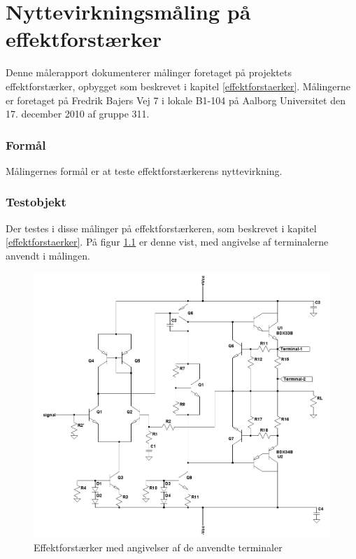 \chapter{Nyttevirkningsmåling på effektforstærker}
\label{maalejournal-nytte}

Denne målerapport dokumenterer målinger foretaget på projektets effektforstærker, opbygget som beskrevet i kapitel \ref{effektforstaerker}. Målingerne er foretaget på Fredrik Bajers Vej 7 i lokale B1-104 på Aalborg Universitet den 17. december 2010 af gruppe 311.

\subsection*{Formål}

Målingernes formål er at teste effektforstærkerens nyttevirkning.


\subsection*{Testobjekt}
Der testes i disse målinger på effektforstærkeren, som beskrevet i kapitel \ref{effektforstaerker}. På figur \ref{fig:testob_efforstaerker_nytte} er denne vist, med angivelse af terminalerne anvendt i målingen.

\begin{figure}[h]
\centering
\includegraphics[width=\textwidth]{maalerapporter/effektforstaerker/effektforstaerker_nyttevirkning_test.png}
\caption{Effektforstærker med angivelser af de anvendte terminaler}
\label{fig:testob_efforstaerker_nytte}
\end{figure}

